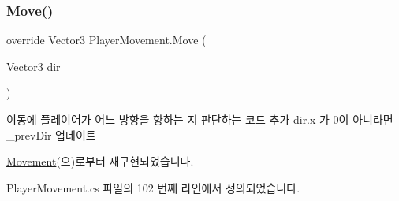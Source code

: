 \subsubsection{\texorpdfstring{Move()}{Move()}\hspace{0.1cm}{\footnotesize\ttfamily [2/2]}}
{\footnotesize\ttfamily override Vector3 Player\+Movement.\+Move (\begin{DoxyParamCaption}\item[{Vector3}]{dir }\end{DoxyParamCaption})\hspace{0.3cm}{\ttfamily [virtual]}}



이동에 플레이어가 어느 방향을 향하는 지 판단하는 코드 추가 dir.\+x 가 0이 아니라면 \+\_\+prev\+Dir 업데이트 



\mbox{\hyperlink{class_movement_a0a304da685db92346b7e274c2b0f023e}{Movement}}(으)로부터 재구현되었습니다.



Player\+Movement.\+cs 파일의 102 번째 라인에서 정의되었습니다.


